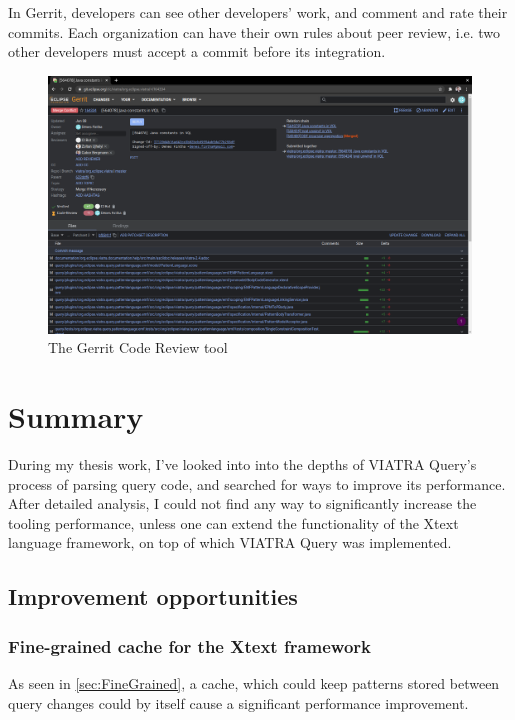 \documentclass[11pt,a4paper,oneside]{report}
\begin{document}
In Gerrit, developers can see other developers' work, and comment and rate their
commits. Each organization can have their own rules about peer review, i.e. two
other developers must accept a commit before its integration.

\begin{figure}[ht]
\centering
\includegraphics[width=150mm, keepaspectratio]{figures/gerrit.png}
\caption{The Gerrit Code Review tool}
\label{fig:gerrit}
\end{figure}

\chapter{Summary}

During my thesis work, I've looked into into the depths of VIATRA Query's
process of parsing query code, and searched for ways to improve its performance.
After detailed analysis, I could not find any way to significantly increase the
tooling performance, unless one can extend the functionality of the Xtext
language framework, on top of which VIATRA Query was implemented.

\section{Improvement opportunities}

\subsection{Fine-grained cache for the Xtext framework}
As seen in \ref{sec:FineGrained}, a cache, which could keep patterns stored
between query changes could by itself cause a significant performance
improvement.
\end{document}
